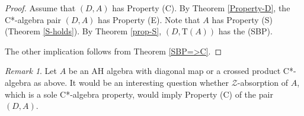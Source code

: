 \documentclass[12pt, oneside, psamsfonts]{amsart}
\newtheorem{thm}{Theorem}[section]
\theoremstyle{definition}
\theoremstyle{remark}
\newtheorem{rem}[thm]{Remark}
\numberwithin{equation}{section}
\newcommand{\tr}{\mathrm{T}}
\begin{document}
\begin{proof}
Assume that $(D, A)$ has Property (C). By Theorem \ref{Property-D}, the C*-algebra pair  $(D, A)$ has Property (E). Note that $A$ has Property (S) (Theorem \ref{S-holds}).  By Theorem \ref{prop-S}, $(D, \tr(A))$ has the (SBP).

The other implication follows from Theorem \ref{SBP=>C}.
\end{proof}

\begin{rem}
Let $A$ be an AH algebra with diagonal map or a crossed product C*-algebra as above. It would be an interesting question whether $\mathcal Z$-absorption of $A$, which is a sole C*-algebra property, would imply Property (C) of the pair $(D, A)$.  
\end{rem}

\end{document}

